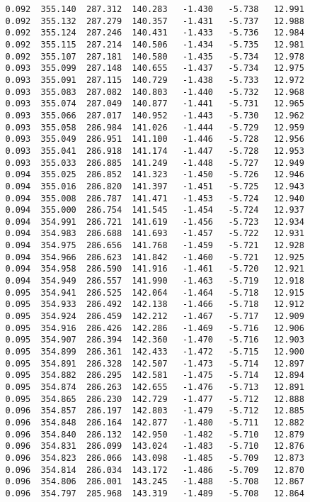 \begin{verbatim}
   0.092  355.140  287.312  140.283   -1.430   -5.738   12.991
   0.092  355.132  287.279  140.357   -1.431   -5.737   12.988
   0.092  355.124  287.246  140.431   -1.433   -5.736   12.984
   0.092  355.115  287.214  140.506   -1.434   -5.735   12.981
   0.092  355.107  287.181  140.580   -1.435   -5.734   12.978
   0.093  355.099  287.148  140.655   -1.437   -5.734   12.975
   0.093  355.091  287.115  140.729   -1.438   -5.733   12.972
   0.093  355.083  287.082  140.803   -1.440   -5.732   12.968
   0.093  355.074  287.049  140.877   -1.441   -5.731   12.965
   0.093  355.066  287.017  140.952   -1.443   -5.730   12.962
   0.093  355.058  286.984  141.026   -1.444   -5.729   12.959
   0.093  355.049  286.951  141.100   -1.446   -5.728   12.956
   0.093  355.041  286.918  141.174   -1.447   -5.728   12.953
   0.093  355.033  286.885  141.249   -1.448   -5.727   12.949
   0.094  355.025  286.852  141.323   -1.450   -5.726   12.946
   0.094  355.016  286.820  141.397   -1.451   -5.725   12.943
   0.094  355.008  286.787  141.471   -1.453   -5.724   12.940
   0.094  355.000  286.754  141.545   -1.454   -5.724   12.937
   0.094  354.991  286.721  141.619   -1.456   -5.723   12.934
   0.094  354.983  286.688  141.693   -1.457   -5.722   12.931
   0.094  354.975  286.656  141.768   -1.459   -5.721   12.928
   0.094  354.966  286.623  141.842   -1.460   -5.721   12.925
   0.094  354.958  286.590  141.916   -1.461   -5.720   12.921
   0.094  354.949  286.557  141.990   -1.463   -5.719   12.918
   0.095  354.941  286.525  142.064   -1.464   -5.718   12.915
   0.095  354.933  286.492  142.138   -1.466   -5.718   12.912
   0.095  354.924  286.459  142.212   -1.467   -5.717   12.909
   0.095  354.916  286.426  142.286   -1.469   -5.716   12.906
   0.095  354.907  286.394  142.360   -1.470   -5.716   12.903
   0.095  354.899  286.361  142.433   -1.472   -5.715   12.900
   0.095  354.891  286.328  142.507   -1.473   -5.714   12.897
   0.095  354.882  286.295  142.581   -1.475   -5.714   12.894
   0.095  354.874  286.263  142.655   -1.476   -5.713   12.891
   0.095  354.865  286.230  142.729   -1.477   -5.712   12.888
   0.096  354.857  286.197  142.803   -1.479   -5.712   12.885
   0.096  354.848  286.164  142.877   -1.480   -5.711   12.882
   0.096  354.840  286.132  142.950   -1.482   -5.710   12.879
   0.096  354.831  286.099  143.024   -1.483   -5.710   12.876
   0.096  354.823  286.066  143.098   -1.485   -5.709   12.873
   0.096  354.814  286.034  143.172   -1.486   -5.709   12.870
   0.096  354.806  286.001  143.245   -1.488   -5.708   12.867
   0.096  354.797  285.968  143.319   -1.489   -5.708   12.864

\end{verbatim}
